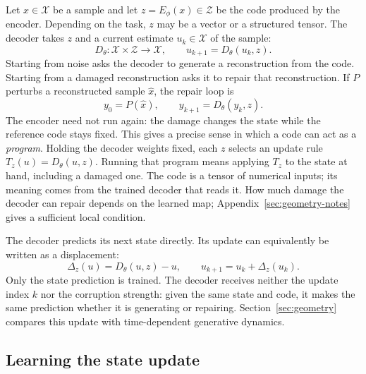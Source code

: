 Let $x\in\mathcal X$ be a sample and let $z=E_\phi(x)\in\mathcal Z$ be the code produced by the encoder. Depending on the task, $z$ may be a vector or a structured tensor. The decoder takes $z$ and a current estimate $u_k\in\mathcal X$ of the sample:
\begin{equation}
 D_\theta:\mathcal X\times\mathcal Z\to\mathcal X,
 \qquad u_{k+1}=D_\theta(u_k,z).
 \label{eq:family-recurrence}
\end{equation}
Starting from noise asks the decoder to generate a reconstruction from the code. Starting from a damaged reconstruction asks it to repair that reconstruction. If $P$ perturbs a reconstructed sample $\widehat x$, the repair loop is
\begin{equation}
 y_0=P(\widehat x),\qquad y_{k+1}=D_\theta(y_k,z).
 \label{eq:family-regeneration}
\end{equation}
The encoder need not run again: the damage changes the state while the reference code stays fixed. This gives a precise sense in which a code can act as a \emph{program}. Holding the decoder weights fixed, each $z$ selects an update rule $T_z(u)=D_\theta(u,z)$. Running that program means applying $T_z$ to the state at hand, including a damaged one. The code is a tensor of numerical inputs; its meaning comes from the trained decoder that reads it. How much damage the decoder can repair depends on the learned map; Appendix~\ref{sec:geometry-notes} gives a sufficient local condition.

The decoder predicts its next state directly. Its update can equivalently be written as a displacement:
\begin{equation}
 \Delta_z(u)=D_\theta(u,z)-u,
 \qquad u_{k+1}=u_k+\Delta_z(u_k).
 \label{eq:direct-displacement}
\end{equation}
Only the state prediction is trained. The decoder receives neither the update index $k$ nor the corruption strength: given the same state and code, it makes the same prediction whether it is generating or repairing. Section~\ref{sec:geometry} compares this update with time-dependent generative dynamics.

\subsection{Learning the state update}

